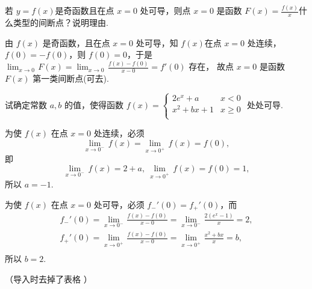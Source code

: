 \begin{problem} 
若 $y = f(x)$是奇函数且在点 $x = 0$ 处可导，则点 $x = 0$ 是函数
$\displaystyle F\left( x \right) = \frac{f\left( x \right)}{x}$什么类型的间断点？说明理由.

\begin{solution}
	由 $f(x)$ 是奇函数，且在点 $x = 0$ 处可导，知 $f(x)$在点
$x = 0$ 处连续，$f\left( 0 \right) = - f(0)$，则
$f\left( 0 \right) = 0$，于是
$\displaystyle \lim_{x \rightarrow 0}\mspace{2mu} F(x) = \lim_{x \rightarrow 0}\mspace{2mu}\frac{f(x) - f(0)}{x - 0} = f'(0)$
存在，
故点 $x = 0$ 是函数 $F\left( x \right)$ 第一类间断点(可去).
\end{solution}

\end{problem}

\begin{problem}
试确定常数 $a,b$ 的值，使得函数
$f\left( x \right) = \begin{cases}
2e^{x} + a & x < 0 \\
x^{2} + bx + 1 & x \geq 0 \\
\end{cases}$ 处处可导.

\begin{solution}
	为使 $f\left( x \right)$ 在点 $x = 0$ 处连续，必须
$$\lim_{x \rightarrow 0^{-}}{\,f}\left( x \right) = \lim_{x \rightarrow 0^{+}}{\,f}\left( x \right) = f(0),$$
即
$$\lim_{x \rightarrow 0^{-}}{\,f}\left( x \right) = 2 + a,\ \lim_{x \rightarrow 0^{+}}{\,f}\left( x \right) = f\left( 0 \right) = 1,$$ 所以
$a = - 1$.

为使 $f\left( x \right)$ 在点 $x = 0$ 处可导，必须
$f_{-}'\left( 0 \right) = f_{+}'(0)$，而
\begin{equation*}\begin{split}
f_{-}'(0) = \lim_{x \rightarrow 0^{-}}\mspace{2mu}\frac{f(x) - f(0)}{x - 0} = \lim_{x \rightarrow 0^{-}}\mspace{2mu}\frac{2\left( e^{x} - 1 \right)}{x} = 2, \\
f_{+}'(0) = \lim_{x \rightarrow 0^{+}}\mspace{2mu}\frac{f(x) - f(0)}{x - 0} = \lim_{x \rightarrow 0^{+}}\mspace{2mu}\frac{x^{2} + bx}{x} = b, \\
\end{split}
\end{equation*} 
所以 $b = 2$.
\end{solution}


（导入时去掉了表格 ）

\end{problem}

